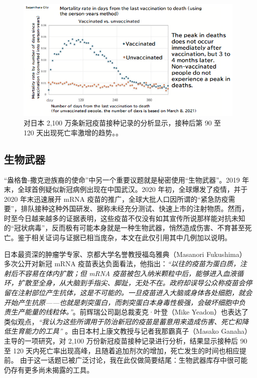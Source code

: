 \documentclass[10pt,twocolumn,letterpaper]{article}
\begin{document}
\clearpage
\twocolumn

\begin{figure}[t]
\begin{center}
\includegraphics[width=1\textwidth]{japan.png}
\end{center}
   \caption{对日本 2,100 万条新冠疫苗接种记录的分析显示，接种后第 90 至 120 天出现死亡率激增的趋势。\cite{40,41}。}
   \label{fig:17}
\end{figure}

\subsection{生物武器}
“盎格鲁-撒克逊族裔的使命”中另一个重要议题就是秘密使用“生物武器”。2019 年末，全球首例疑似新冠病例出现在中国武汉。2020 年初，全球爆发了疫情，并于 2020 年末迅速展开 mRNA 疫苗的推广，全球大批人口因所谓的“紧急防疫需要”，排队接种这种外国研发、据称未经充分测试、快速上市的注射物质\cite{31}。然而，时至今日越来越多的证据表明，这些疫苗不仅没有如其宣传所说那样能对抗未知的“冠状病毒”，反而极有可能本身就是一种生物武器，悄然造成伤害、不育甚至死亡。鉴于相关证词与证据已相当庞杂，本文在此仅引用其中几例加以说明。

日本最资深的肿瘤学专家、京都大学名誉教授福岛雅典（Masanori Fukushima）多次公开对新冠 mRNA 疫苗表达负面看法，他指出\cite{35,36}：\textit{“以往的疫苗为蛋白质，注射后不容易在体内扩散；但 mRNA 疫苗被包入纳米颗粒中后，能够进入血液循环，扩散至全身，从大脑到手指尖、脚趾，无处不在。政府却误导公众称疫苗会停留在注射部位产生抗体，这是不可能的。一旦疫苗进入大脑或身体各处细胞，就会开始产生抗原——也就是刺突蛋白，而刺突蛋白本身毒性极强，会破坏细胞中负责生产能量的线粒体。”\cite{37,38}}。前辉瑞公司副总裁麦克·叶登（Mike Yeadon）也表达了类似观点，\textit{“我认为这些所谓用于防治新冠的疫苗是蓄意用来造成伤害、死亡和降低生育能力的工具” \cite{39}}。由日本村上康文教授与记者我那霸真子（Masako Ganaha）主导的一项研究，对 2,100 万份新冠疫苗接种记录进行分析，结果显示接种后 90 至 120 天内死亡率出现高峰，且随着追加剂次的增加，死亡发生的时间也相应提前\cite{40,41}。
由于这一话题已被广泛讨论，我在此仅做简要结尾：生物武器库存中很可能仍存有更多尚未揭露的工具。
\end{document}
